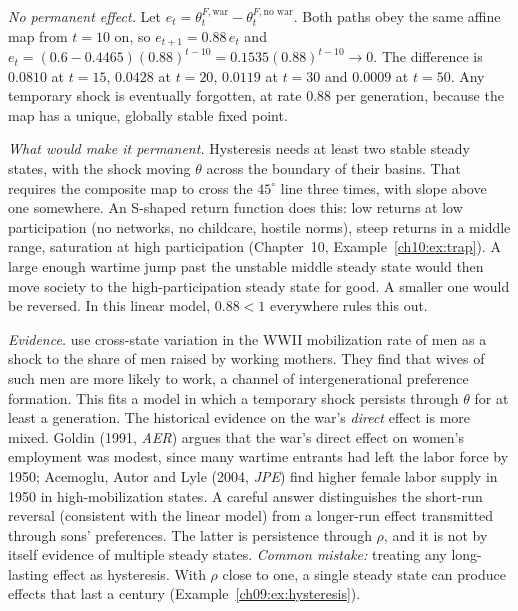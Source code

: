 \documentclass[../solutions_manual.tex]{subfiles}
\begin{document}
 \emph{No permanent effect.} Let $e_t = \theta^{F,\text{war}}_t - \theta^{F,\text{no war}}_t$. Both paths obey the same affine map from $t = 10$ on, so $e_{t+1} = 0.88\,e_t$ and $e_t = (0.6 - 0.4465)(0.88)^{t-10} = 0.1535(0.88)^{t-10} \to 0$. The difference is $0.0810$ at $t = 15$, $0.0428$ at $t = 20$, $0.0119$ at $t = 30$ and $0.0009$ at $t = 50$. Any temporary shock is eventually forgotten, at rate $0.88$ per generation, because the map has a unique, globally stable fixed point.

\emph{What would make it permanent.} Hysteresis needs at least two stable steady states, with the shock moving $\theta$ across the boundary of their basins. That requires the composite map to cross the $45^\circ$ line three times, with slope above one somewhere. An S-shaped return function does this: low returns at low participation (no networks, no childcare, hostile norms), steep returns in a middle range, saturation at high participation (Chapter~10, Example~\ref{ch10:ex:trap}). A large enough wartime jump past the unstable middle steady state would then move society to the high-participation steady state for good. A smaller one would be reversed. In this linear model, $0.88 < 1$ everywhere rules this out.

\emph{Evidence.} \citet{fernandez2004mothers} use cross-state variation in the WWII mobilization rate of men as a shock to the share of men raised by working mothers. They find that wives of such men are more likely to work, a channel of intergenerational preference formation. This fits a model in which a temporary shock persists through $\theta$ for at least a generation. The historical evidence on the war's \emph{direct} effect is more mixed. Goldin (1991, \textit{AER}) argues that the war's direct effect on women's employment was modest, since many wartime entrants had left the labor force by 1950; Acemoglu, Autor and Lyle (2004, \textit{JPE}) find higher female labor supply in 1950 in high-mobilization states. A careful answer distinguishes the short-run reversal (consistent with the linear model) from a longer-run effect transmitted through sons' preferences. The latter is persistence through $\rho$, and it is not by itself evidence of multiple steady states. \emph{Common mistake:} treating any long-lasting effect as hysteresis. With $\rho$ close to one, a single steady state can produce effects that last a century (Example~\ref{ch09:ex:hysteresis}).

\end{document}
